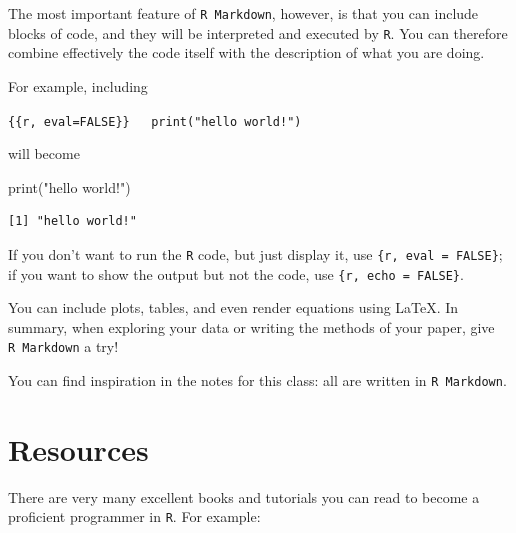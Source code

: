 \documentclass[
  letterpaper,
  DIV=11,
  numbers=noendperiod]{scrreprt}
\newenvironment{Shaded}{\begin{snugshade}}{\end{snugshade}}
\newcommand{\FunctionTok}[1]{\textcolor[rgb]{0.28,0.35,0.67}{#1}}
\newcommand{\NormalTok}[1]{\textcolor[rgb]{0.00,0.23,0.31}{#1}}
\newcommand{\StringTok}[1]{\textcolor[rgb]{0.13,0.47,0.30}{#1}}
\begin{document}
The most important feature of \texttt{R\ Markdown}, however, is that you
can include blocks of code, and they will be interpreted and executed by
\texttt{R}. You can therefore combine effectively the code itself with
the description of what you are doing.

For example, including

\texttt{\{\{r,\ eval=FALSE\}\}\ \ \ print("hello\ world!")}

will become

\begin{Shaded}
\begin{Highlighting}[]
\FunctionTok{print}\NormalTok{(}\StringTok{"hello world!"}\NormalTok{)  }
\end{Highlighting}
\end{Shaded}

\begin{verbatim}
[1] "hello world!"
\end{verbatim}

If you don't want to run the \texttt{R} code, but just display it, use
\texttt{\{r,\ eval\ =\ FALSE\}}; if you want to show the output but not
the code, use \texttt{\{r,\ echo\ =\ FALSE\}}.

You can include plots, tables, and even render equations using LaTeX. In
summary, when exploring your data or writing the methods of your paper,
give \texttt{R\ Markdown} a try!

You can find inspiration in the notes for this class: all are written in
\texttt{R\ Markdown}.

\hypertarget{resources}{%
\section{Resources}\label{resources}}

There are very many excellent books and tutorials you can read to become
a proficient programmer in \texttt{R}. For example:
\end{document}
